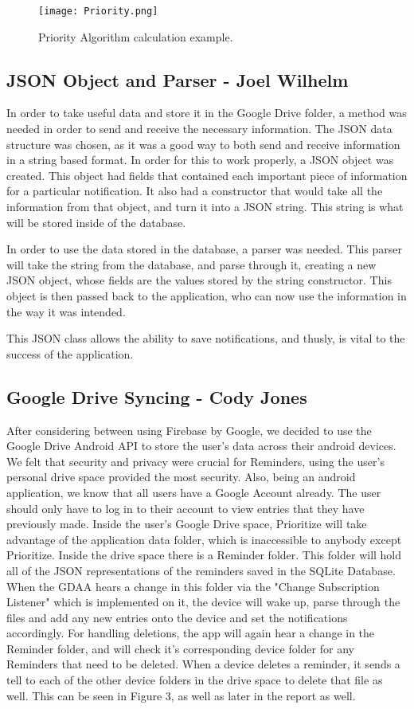 \documentclass[12pt]{article}
\begin{document}
\begin{figure}[h]
\texttt{[image: Priority.png]}
\centering
\caption{Priority Algorithm calculation example.}
\end{figure}

\subsection{JSON Object and Parser - Joel Wilhelm}
In order to take useful data and store it in the Google Drive folder, a method was needed in order to send and receive the necessary information. The JSON data structure was chosen, as it was a good way to both send and receive information in a string based format. In order for this to work properly, a JSON object was created. This object had fields that contained each important piece of information for a particular notification. It also had a constructor that would take all the information from that object, and turn it into a JSON string. This string is what will be stored inside of the database.

In order to use the data stored in the database, a parser was needed. This parser will take the string from the database, and parse through it, creating a new JSON object, whose fields are the values stored by the string constructor. This object is then passed back to the application, who can now use the information in the way it was intended. 

This JSON class allows the ability to save notifications, and thusly, is vital to the success of the application. 


\subsection{Google Drive Syncing - Cody Jones}
After considering between using Firebase by Google, we decided to use the Google Drive Android API to store the user's data across their android devices. We felt that security and privacy were crucial for Reminders, using the user's personal drive space provided the most security. Also, being an android application, we know that all users have a Google Account already. The user should only have to log in to their account to view entries that they have previously made. Inside the user's Google Drive space, Prioritize will take advantage of the application data folder, which is inaccessible to anybody except Prioritize. Inside the drive space there is a Reminder folder. This folder will hold all of the JSON representations of the reminders saved in the SQLite Database. When the GDAA hears a change in this folder via the "Change Subscription Listener" which is implemented on it, the device will wake up, parse through the files and add any new entries onto the device and set the notifications accordingly. For handling deletions, the app will again hear a change in the Reminder folder, and will check it's corresponding device folder for any Reminders that need to be deleted. When a device deletes a reminder, it sends a tell to each of the other device folders in the drive space to delete that file as well. This can be seen in Figure 3, as well as later in the  report as well.
\end{document}

